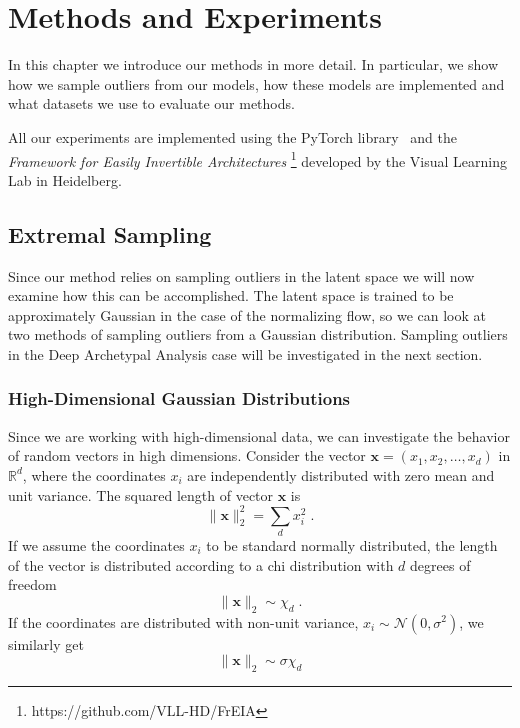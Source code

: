 \chapter{Methods and Experiments}%
\label{cha:methods}


In this chapter we introduce our methods in more detail. In particular, we show
how we sample outliers from our models, how these models are implemented and
what datasets we use to evaluate our methods.

All our experiments are implemented using the PyTorch
library~\citep{paszkePyTorchImperativeStyle2019} and the \textit{Framework for
Easily Invertible Architectures} \footnote{https://github.com/VLL-HD/FrEIA}
developed by the Visual Learning Lab in Heidelberg.

\section{Extremal Sampling}%
\label{sec:extremal_sampling}

Since our method relies on sampling outliers in the latent space we will now
examine how this can be accomplished. The latent space is trained to be
approximately Gaussian in the case of the normalizing flow, so we can look at
two methods of sampling outliers from a Gaussian distribution. Sampling
outliers in the Deep Archetypal Analysis case will be investigated in the next
section.

\subsection{High-Dimensional Gaussian Distributions}%
\label{sub:high_dimensional_gaussian_distributions}
Since we are working with high-dimensional data, we can investigate the
behavior of random vectors in high dimensions.
Consider the vector $\mathbf{x} = (x_1, x_2, \dots, x_d)$ in $\mathbb{R}^d$, where the
coordinates $x_i$ are independently distributed with zero mean and unit
variance. The squared length of vector $\mathbf{x}$ is
\begin{equation}%
	\label{eq:square_norm}
	\lVert \mathbf{x} \rVert_2^2 = \sum_d x_i^2\;.
\end{equation}
If we assume the coordinates $x_i$ to be standard normally distributed, the
length of the vector is distributed according to a chi distribution with
$d$ degrees of freedom
\begin{equation}%
	\label{eq:sq_norm_chi}
	\lVert \mathbf{x} \rVert_2 \sim \chi_d\;.
\end{equation}
If the coordinates are distributed with non-unit variance, $x_i \sim
	\mathcal{N}(0, \sigma^2)$, we similarly get
\begin{equation}%
	\label{eq:sq_norm_chi_sigma}
	\lVert \mathbf{x} \rVert_2 \sim \sigma\chi_d
\end{equation}

